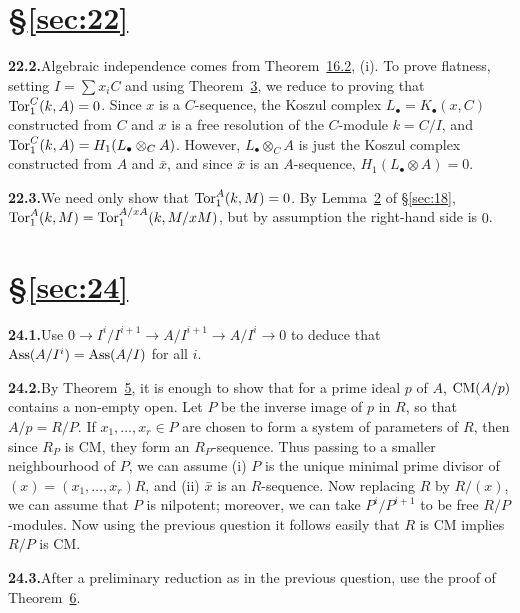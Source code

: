 
\section*{\S\ref{sec:22}}

\noindent\textbf{22.2.}\quad Algebraic independence comes from Theorem~\hyperref[thm:16.2]{16.2}, (i).
To prove flatness, setting $I = \sum x_iC$ and using Theorem~\hyperref[thm:22.3]{3}, we reduce to
proving that $\operatorname{Tor}^C_1(k, A) = 0$. Since $x$ is a $C$-sequence, the Koszul complex
$L_\bullet = K_\bullet(x, C)$ constructed from $C$ and $x$ is a free resolution of the
$C$-module $k = C/I$, and $\operatorname{Tor}^C_1(k, A) = H_1(L_\bullet \otimes_C A)$. However,
$L_\bullet \otimes_C A$ is just the Koszul complex constructed from $A$ and $\bar{x}$, and since
$\bar{x}$ is an $A$-sequence, $H_1(L_\bullet \otimes A) = 0$.

\noindent\textbf{22.3.}\quad We need only show that $\operatorname{Tor}^A_1(k, M) = 0$. By Lemma~\hyperref[lem:18.2]{2} of
\S\ref{sec:18}, $\operatorname{Tor}^A_1(k, M) = \operatorname{Tor}^{A/xA}_1(k, M/xM)$, but by assumption the right-hand
side is $0$.

\section*{\S\ref{sec:24}}

\noindent\textbf{24.1.}\quad Use $0 \to I^i/I^{i+1} \to A/I^{i+1} \to A/I^i \to 0$ to deduce that
$\operatorname{Ass}(A/I^i) = \operatorname{Ass}(A/I)$ for all $i$.

\noindent\textbf{24.2.}\quad By Theorem~\hyperref[thm:24.5]{5}, it is enough to show that for a prime ideal $p$ of
$A$, $\operatorname{CM}(A/p)$ contains a non-empty open. Let $P$ be the inverse image of $p$ in $R$,
so that $A/p = R/P$. If $x_1, \ldots, x_r \in P$ are chosen to form a system of
parameters of $R$, then since $R_P$ is CM, they form an $R_P$-sequence. Thus passing
to a smaller neighbourhood of $P$, we can assume (i) $P$ is the unique minimal
prime divisor of $(x) = (x_1, \ldots, x_r)R$, and (ii) $\bar{x}$ is an $R$-sequence. Now
replacing $R$ by $R/(x)$, we can assume that $P$ is nilpotent; moreover, we can
take $P^i/P^{i+1}$ to be free $R/P$-modules. Now using the previous question it
follows easily that $R$ is CM implies $R/P$ is CM.

\noindent\textbf{24.3.}\quad After a preliminary reduction as in the previous question, use the
proof of Theorem~\hyperref[thm:24.6]{6}.
